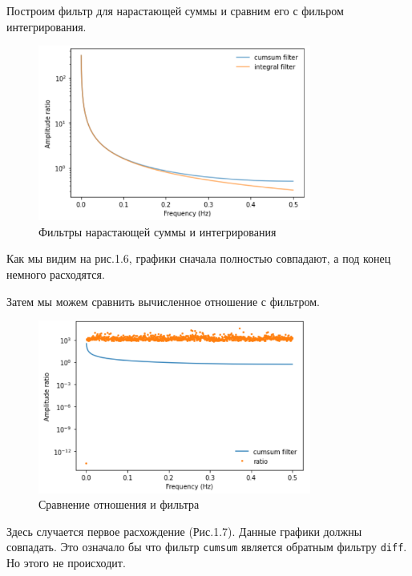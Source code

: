 \documentclass[a4paper,12pt]{report}
\begin{document}
    Построим фильтр для нарастающей суммы и сравним его с фильром интегрирования.
\begin{figure}[H]
        \centering
        \includegraphics[width=0.8\textwidth]{fig1-6.PNG}
        \caption{Фильтры нарастающей суммы и интегрирования}
        \label{fig:fig1-6}
\end{figure}  
    
    Как мы видим на рис.1.6, графики сначала полностью совпадают, а под конец немного расходятся.
    
    Затем мы можем сравнить вычисленное отношение с фильтром. 
\begin{figure}[H]
        \centering
        \includegraphics[width=0.8\textwidth]{fig1-7.PNG}
        \caption{Сравнение отношения и фильтра}
        \label{fig:fig1-7}
\end{figure}   

    Здесь случается первое расхождение (Рис.1.7). Данные графики должны совпадать. Это означало бы что фильтр \texttt{cumsum} является обратным фильтру \texttt{diff}. Но этого не происходит.
    
\end{document}
